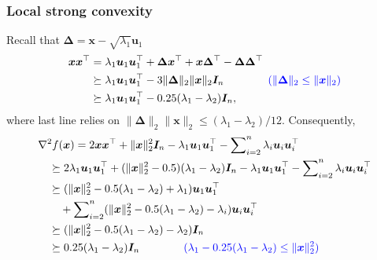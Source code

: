 \documentclass[compress,
mathserif,wide,%
]{beamer}
\begin{document}
\begin{frame}
	\frametitle{Local strong convexity}
	Recall that $\bm{\Delta} = \bm{x} - \sqrt{\lambda_1} \bm{u}_{1}$
	\begin{align*}
		\bm{x} \bm{x}^{\top} &= \lambda_{1} \bm{u}_1 \bm{u}_1^\top + \bm{\Delta} \bm{x}^\top 
		+ \bm{x} \bm{\Delta}^\top - \bm{\Delta} \bm{\Delta}^\top \\
		& \succeq \lambda_{1} \bm{u}_1 \bm{u}_1^\top - 3 \| \bm{\Delta} \|_{2} \| \bm{x} \|_2 \bm{I}_{n} \qquad \qquad \textcolor{blue}{ (\|\bm{\Delta}\|_2 \leq  \|\bm{x}\|_2)} \\
		&\succeq \lambda_{1} \bm{u}_1 \bm{u}_1^\top - 0.25 ( \lambda_{1} - \lambda_{2} ) \bm{I}_{n},
	\end{align*}
	where last line relies on $\| \bm{\Delta} \|_{2} \|\bm{x} \|_2 \leq (\lambda_{1} - \lambda_{2}) / 12$. Consequently,
	\begin{align*}
		& \nabla^2 f({\bm x}) = 2{\bm x}{\bm x}^{\top} + \|\bm{x}\|_2^2 \bm{I}_{n} - \lambda_{1} \bm{u}_1 \bm{u}_1^\top - \sum\nolimits_{i=2}^{n} \lambda_{i} \bm{u}_i \bm{u}_i^\top \\
		&\quad \succeq 2 \lambda_{1} \bm{u}_1 \bm{u}_1^\top + (\|\bm{x}\|_2^2 - 0.5) ( \lambda_{1} - \lambda_{2} ) \bm{I}_{n} - \lambda_{1} \bm{u}_1 \bm{u}_1^\top - \sum\nolimits_{i=2}^{n} \lambda_{i} \bm{u}_i \bm{u}_i^\top \\
		&\quad \succeq (\|\bm{x}\|_2^2  - 0.5 ( \lambda_{1} - \lambda_{2} ) +\lambda_{1})  \bm{u}_1 \bm{u}_1^\top \\
		&\quad\quad + \sum\nolimits_{i=2}^{n} ( \|\bm{x}\|_2^2 - 0.5 ( \lambda_{1} - \lambda_{2} ) - \lambda_{i} ) \bm{u}_i \bm{u}_i^\top \\
		&\quad \succeq ( \|\bm{x}\|_2^2 - 0.5 ( \lambda_{1} - \lambda_{2} ) - \lambda_{2} ) \bm{I}_{n} \\
		&\quad \succeq 0.25 ( \lambda_{1} - \lambda_{2} ) \bm{I}_{n} \qquad \qquad \textcolor{blue}{ (\lambda_1 - 0.25 (\lambda_1 - \lambda_2) \leq \|\bm{x}\|_2^2)}
	\end{align*}
\end{frame}


 
\end{document}
